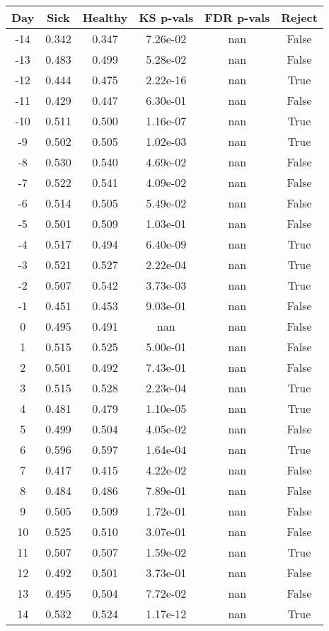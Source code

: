 \begin{tabular}{c|c|c|c|c|c}
Day &  Sick & Healthy &  KS p-vals & FDR p-vals & Reject\\
\hline
-14 & 0.342 &   0.347 &   7.26e-02 &        nan &  False\\
-13 & 0.483 &   0.499 &   5.28e-02 &        nan &  False\\
-12 & 0.444 &   0.475 &   2.22e-16 &        nan &   True\\
-11 & 0.429 &   0.447 &   6.30e-01 &        nan &  False\\
-10 & 0.511 &   0.500 &   1.16e-07 &        nan &   True\\
 -9 & 0.502 &   0.505 &   1.02e-03 &        nan &   True\\
 -8 & 0.530 &   0.540 &   4.69e-02 &        nan &  False\\
 -7 & 0.522 &   0.541 &   4.09e-02 &        nan &  False\\
 -6 & 0.514 &   0.505 &   5.49e-02 &        nan &  False\\
 -5 & 0.501 &   0.509 &   1.03e-01 &        nan &  False\\
 -4 & 0.517 &   0.494 &   6.40e-09 &        nan &   True\\
 -3 & 0.521 &   0.527 &   2.22e-04 &        nan &   True\\
 -2 & 0.507 &   0.542 &   3.73e-03 &        nan &   True\\
 -1 & 0.451 &   0.453 &   9.03e-01 &        nan &  False\\
  0 & 0.495 &   0.491 &        nan &        nan &  False\\
  1 & 0.515 &   0.525 &   5.00e-01 &        nan &  False\\
  2 & 0.501 &   0.492 &   7.43e-01 &        nan &  False\\
  3 & 0.515 &   0.528 &   2.23e-04 &        nan &   True\\
  4 & 0.481 &   0.479 &   1.10e-05 &        nan &   True\\
  5 & 0.499 &   0.504 &   4.05e-02 &        nan &  False\\
  6 & 0.596 &   0.597 &   1.64e-04 &        nan &   True\\
  7 & 0.417 &   0.415 &   4.22e-02 &        nan &  False\\
  8 & 0.484 &   0.486 &   7.89e-01 &        nan &  False\\
  9 & 0.505 &   0.509 &   1.72e-01 &        nan &  False\\
 10 & 0.525 &   0.510 &   3.07e-01 &        nan &  False\\
 11 & 0.507 &   0.507 &   1.59e-02 &        nan &   True\\
 12 & 0.492 &   0.501 &   3.73e-01 &        nan &  False\\
 13 & 0.495 &   0.504 &   7.72e-02 &        nan &  False\\
 14 & 0.532 &   0.524 &   1.17e-12 &        nan &   True\\
\end{tabular}